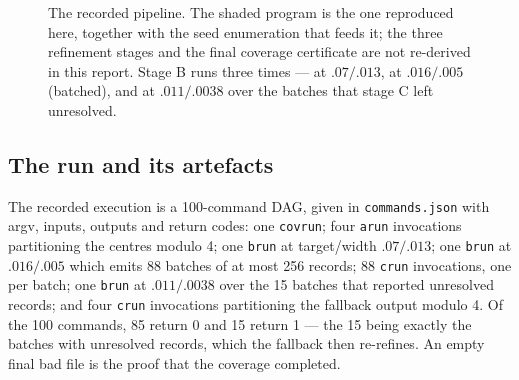 \documentclass[11pt,a4paper]{article}
\newcommand{\code}[1]{\texttt{\small #1}}
\begin{document}
\begin{figure}[t]
\centering
{}
\caption{The recorded pipeline. The shaded program is the one reproduced here, together with the
seed enumeration that feeds it; the three refinement stages and the final coverage certificate are
not re-derived in this report. Stage B runs three times --- at $.07/.013$, at $.016/.005$ (batched),
and at $.011/.0038$ over the batches that stage C left unresolved.}
\label{fig:pipeline}
\end{figure}

\subsection{The run and its artefacts}
The recorded execution is a 100-command DAG, given in \code{commands.json} with argv, inputs, outputs
and return codes: one \code{covrun}; four \code{arun} invocations partitioning the centres modulo 4;
one \code{brun} at target/width $.07/.013$; one \code{brun} at $.016/.005$ which emits 88 batches of
at most 256 records; 88 \code{crun} invocations, one per batch; one \code{brun} at $.011/.0038$ over
the 15 batches that reported unresolved records; and four \code{crun} invocations partitioning the
fallback output modulo 4. Of the 100 commands, 85 return 0 and 15 return 1 --- the 15 being exactly
the batches with unresolved records, which the fallback then re-refines. An empty final bad file is
the proof that the coverage completed.
\end{document}
